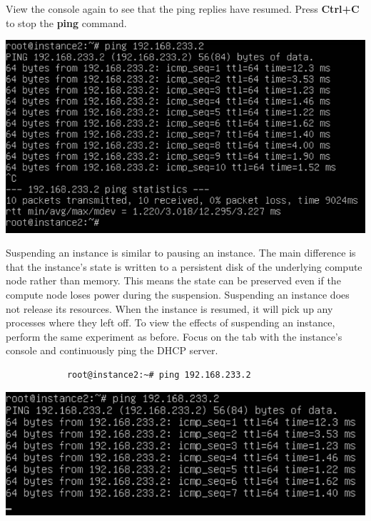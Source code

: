 \documentclass[letterpaper, 12pt]{article}
\begin{document}
\begin{enumerate}
    \begin{labstep}
        View the console again to see that the ping replies have resumed.
        Press \textbf{Ctrl+C} to stop the \textbf{ping} command.

        \begin{center}
            \includegraphics[width=\linewidth]{images/part3/step6.png}
        \end{center}
    \end{labstep}

    \begin{labstep}
        Suspending an instance is similar to pausing an instance.
        The main difference is that the instance's state is written to a persistent disk of the underlying compute node rather than memory.
        This means the state can be preserved even if the compute node loses power during the suspension.
        Suspending an instance does not release its resources.
        When the instance is resumed, it will pick up any processes where they left off.
        To view the effects of suspending an instance, perform the same experiment as before.
        Focus on the tab with the instance's console and continuously ping the DHCP server.
        \begin{lstlisting}
            root@instance2:~# ping 192.168.233.2
        \end{lstlisting}

        \begin{center}
            \includegraphics[width=\linewidth]{images/part3/step7.png}
        \end{center}
    \end{labstep}


\end{enumerate}
\end{document}

